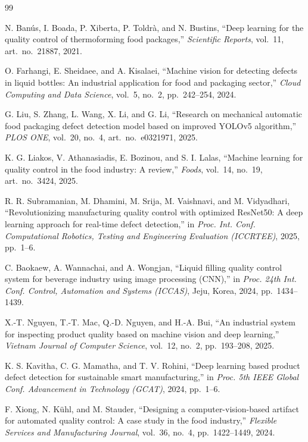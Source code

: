 \begin{thebibliography}{99}

N. Ban\'us, I. Boada, P. Xiberta, P. Toldr\`a, and N. Bustins,
``Deep learning for the quality control of thermoforming food packages,''
\emph{Scientific Reports}, vol.~11, art.~no.~21887, 2021.

O. Farhangi, E. Sheidaee, and A. Kisalaei,
``Machine vision for detecting defects in liquid bottles: An industrial application for food and packaging sector,''
\emph{Cloud Computing and Data Science}, vol.~5, no.~2, pp.~242--254, 2024.

G. Liu, S. Zhang, L. Wang, X. Li, and G. Li,
``Research on mechanical automatic food packaging defect detection model based on improved YOLOv5 algorithm,''
\emph{PLOS ONE}, vol.~20, no.~4, art.~no.~e0321971, 2025.

K. G. Liakos, V. Athanasiadis, E. Bozinou, and S. I. Lalas,
``Machine learning for quality control in the food industry: A review,''
\emph{Foods}, vol.~14, no.~19, art.~no.~3424, 2025.

R. R. Subramanian, M. Dhamini, M. Srija, M. Vaishnavi, and M. Vidyadhari,
``Revolutionizing manufacturing quality control with optimized ResNet50: A deep learning approach for real-time defect detection,''
in \emph{Proc. Int. Conf. Computational Robotics, Testing and Engineering Evaluation (ICCRTEE)}, 2025, pp.~1--6.

C. Baokaew, A. Wannachai, and A. Wongjan,
``Liquid filling quality control system for beverage industry using image processing (CNN),''
in \emph{Proc. 24th Int. Conf. Control, Automation and Systems (ICCAS)}, Jeju, Korea, 2024, pp.~1434--1439.

X.-T. Nguyen, T.-T. Mac, Q.-D. Nguyen, and H.-A. Bui,
``An industrial system for inspecting product quality based on machine vision and deep learning,''
\emph{Vietnam Journal of Computer Science}, vol.~12, no.~2, pp.~193--208, 2025.

K. S. Kavitha, C. G. Mamatha, and T. V. Rohini,
``Deep learning based product defect detection for sustainable smart manufacturing,''
in \emph{Proc. 5th IEEE Global Conf. Advancement in Technology (GCAT)}, 2024, pp.~1--6.

F. Xiong, N. K\"uhl, and M. Stauder,
``Designing a computer-vision-based artifact for automated quality control: A case study in the food industry,''
\emph{Flexible Services and Manufacturing Journal}, vol.~36, no.~4, pp.~1422--1449, 2024.


\end{thebibliography}
